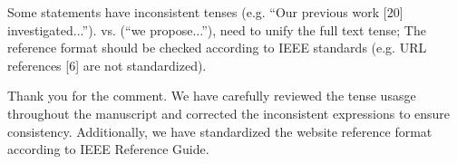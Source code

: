 \begin{revcomment}
	Some statements have inconsistent tenses (e.g. ``Our previous work [20] investigated...''). vs. (``we propose...''), need to unify the full text tense; The reference format should be checked according to IEEE standards (e.g. URL references [6] are not standardized).
\end{revcomment}
\begin{revresponse}
	Thank you for the comment.
	We have carefully reviewed the tense usasge throughout the manuscript and corrected the inconsistent expressions to ensure consistency. Additionally, we have standardized the website reference format according to IEEE Reference Guide.
\end{revresponse}

